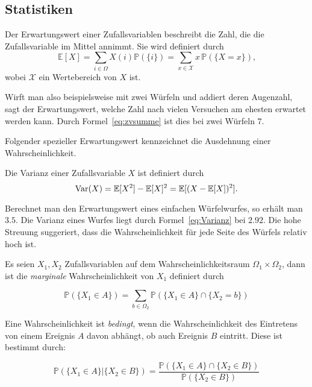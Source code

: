 \subsection{Statistiken}

\begin{Def}[Erwartungswert]
 Der Erwartungswert einer Zufallsvariablen beschreibt die Zahl, die die Zufallsvariable im Mittel annimmt. Sie wird definiert durch
\begin{equation*}
\mathbb{E} [X] = \sum_{i \in \Omega} X (i) \mathbb{P} (\{i\}) = \sum_{x\in\mathcal{X}} x \, \mathbb{P} (\{X=x\}) \text{,}
\end{equation*}
wobei $\mathcal{X}$ ein Wertebereich von $X$ ist.
\end{Def}

Wirft man also beispielsweise mit zwei W\"urfeln und addiert deren Augenzahl, sagt der Erwartungswert, welche Zahl nach vielen Versuchen am ehesten erwartet werden kann. Durch Formel~\eqref{eq:zvsumme} ist dies bei zwei W\"urfeln $7$.


Folgender spezieller Erwartungswert kennzeichnet die Ausdehnung einer Wahrscheinlichkeit. 


\begin{Def}[Varianz]
Die Varianz einer Zufallsvariable $X$ ist definiert durch
\begin{equation}
\label{eq:Varianz}
\Var(X)= \mathbb{E} [X^2] - \mathbb{E} [X]^2 = \mathbb{E} [ (X - \mathbb{E} [X] )^2 ].
\end{equation}

\end{Def}

Berechnet man den Erwartungswert eines einfachen W\"urfelwurfes, so erh\"alt man $3.5$. Die Varianz eines Wurfes liegt durch Formel~\eqref{eq:Varianz} bei $2.92$. Die hohe Streuung suggeriert, dass die Wahrscheinlichkeit f\"ur jede Seite des W\"urfels relativ hoch ist.

\begin{Def}
\label{def:Wkeits}
Es seien $X_{1}, X_{2}$ Zufallsvariablen auf dem Wahrscheinlichkeitsraum $\Omega_{1}\times \Omega_{2}$, dann ist die \emph{marginale} Wahrscheinlichkeit von $X_{1}$ definiert durch 

\begin{equation*}
\mathbb{P} (\{X_{1} \in A \} ) = \sum_{b \in \Omega_{2} } \mathbb{P} (\{X_{1} \in A\} \cap \{X_{2} = b\})
\end{equation*}

Eine Wahrscheinlichkeit ist \emph{bedingt}, wenn die Wahrscheinlichkeit des Eintretens von einem Ereignis $A$ davon abhängt, ob auch Ereignis $B$ eintritt. 
Diese ist bestimmt durch:

\begin{equation*}
\mathbb{P} (\{X_{1} \in A \} | \{ X_{2} \in B \} ) = \frac {\mathbb{P} ( \{X_{1} \in A \} \cap \{X_{2} \in B \})} {\mathbb{P} (\{X_{2} \in B\})}
\end{equation*}
\end{Def}

